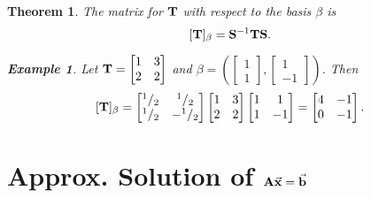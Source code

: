 \documentclass[12pt, a4paper]{article}
\newtheorem{thm}{Theorem}[subsection]
\newtheorem{eg}{Example}[subsection]
\def\T{{\vb{T}}}
\def\vecx{\va{x}}
\def\vecb{\va{b}}
\def\matrixA{\vb{A}}
\def\matrixS{\vb{S}}
\begin{document}
\begin{thm}
	The matrix for $\T$ with respect to the basis $\beta$ is \[[\T]_\beta=\matrixS^{-1}\T\matrixS.\]	
	\begin{eg}
		Let $\T=\begin{bmatrix}1&3\\2&2\end{bmatrix}$ and $\beta=\left(\begin{bmatrix}1\\1\end{bmatrix},\begin{bmatrix}1\\-1\end{bmatrix}\right)$. Then \[[\T]_\beta=\begin{bmatrix}^1/_2&^1/_2\\^1/_2&-^1/_2\end{bmatrix}\begin{bmatrix}1&3\\2&2\end{bmatrix}\begin{bmatrix}1&1\\1&-1\end{bmatrix}=\begin{bmatrix}4&-1\\0&-1\end{bmatrix}.\]
	\end{eg}
\end{thm}

\newpage
\section{Approx. Solution of $\matrixA\vecx=\vecb$}
\end{document}

